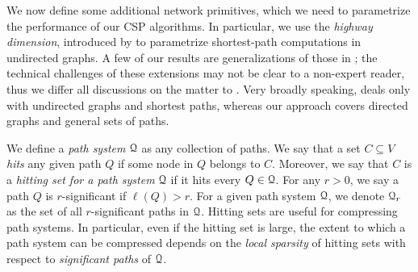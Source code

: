We now define some additional network primitives, which we need to parametrize the performance of our CSP algorithms. 
In particular, we use the \emph{highway dimension}, introduced by \citet{highway2013,highway2010} to parametrize shortest-path computations in undirected graphs. 
A few of our results are generalizations of those in \citep{highway2013}; the technical challenges of these extensions may not be clear to a non-expert reader, thus we differ all discussions on the matter to \cite{TechReport}. 
Very broadly speaking, \cite{highway2013} deals only with undirected graphs and shortest paths, whereas our approach covers directed graphs and general sets of paths.

We define a \emph{path system} $\mathcal{Q}$ as any collection of paths.
We say that a set $C\subseteq V$ \emph{hits} any given path $Q$ if some node in $Q$ belongs to $C$. Moreover, we say that $C$ is a \emph{hitting set for a path system} $\mathcal{Q}$ if it hits every $Q\in\mathcal{Q}$. 
For any $r>0$, we say a path $Q$ is $r$-significant if $\ell(Q)>r$. 
For a given path system $\mathcal{Q}$, we denote $\mathcal{Q}_r$ as the set of all $r$-significant paths in $\mathcal{Q}$.
Hitting sets are useful for compressing path systems. 
In particular, even if the hitting set is large, the extent to which a path system can be compressed depends on the \emph{local sparsity} of hitting sets with respect to \emph{significant paths} of $\mathcal{Q}$.



